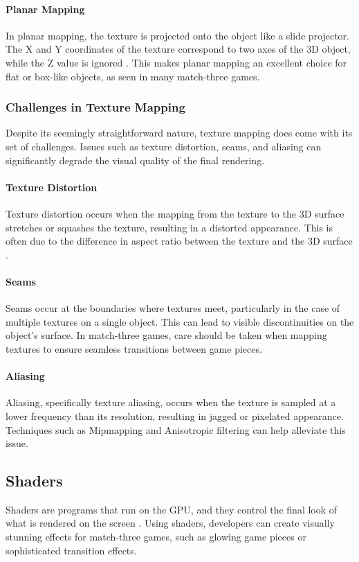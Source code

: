 \documentclass[runningheads, 12pt]{llncs}
\begin{document}
\paragraph{Planar Mapping}
In planar mapping, the texture is projected onto the object like a slide projector. The X and Y coordinates of the texture correspond to two axes of the 3D object, while the Z value is ignored \cite{ref_book8}. This makes planar mapping an excellent choice for flat or box-like objects, as seen in many match-three games.

\subsubsection{Challenges in Texture Mapping}
Despite its seemingly straightforward nature, texture mapping does come with its set of challenges. Issues such as texture distortion, seams, and aliasing can significantly degrade the visual quality of the final rendering.

\paragraph{Texture Distortion}
Texture distortion occurs when the mapping from the texture to the 3D surface stretches or squashes the texture, resulting in a distorted appearance. This is often due to the difference in aspect ratio between the texture and the 3D surface \cite{ref_book2}.

\paragraph{Seams}
Seams occur at the boundaries where textures meet, particularly in the case of multiple textures on a single object. This can lead to visible discontinuities on the object's surface. In match-three games, care should be taken when mapping textures to ensure seamless transitions between game pieces.

\paragraph{Aliasing}
Aliasing, specifically texture aliasing, occurs when the texture is sampled at a lower frequency than its resolution, resulting in jagged or pixelated appearance. Techniques such as Mipmapping and Anisotropic filtering can help alleviate this issue.

\subsection{Shaders}
Shaders are programs that run on the GPU, and they control the final look of what is rendered on the screen \cite{ref_book3}. Using shaders, developers can create visually stunning effects for match-three games, such as glowing game pieces or sophisticated transition effects.
\end{document}
